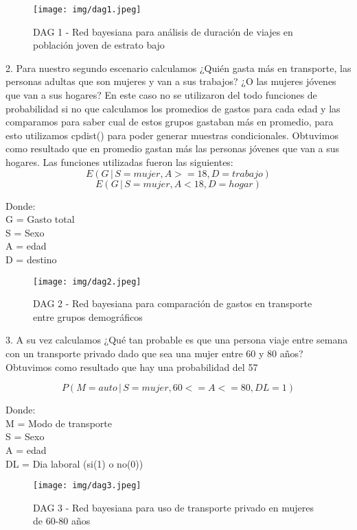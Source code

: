 \documentclass{ajceam-class}   %
\begin{document}
\begin{figure}[h]
\centering
\texttt{[image: img/dag1.jpeg]}
\caption{DAG 1 - Red bayesiana para análisis de duración de viajes en población joven de estrato bajo}
\label{fig:dag1}
\end{figure}

2.	Para nuestro segundo escenario calculamos ¿Quién gasta más en transporte, las personas adultas que son mujeres y van a sus trabajos? ¿O las mujeres jóvenes que van a sus hogares? En este caso no se utilizaron del todo funciones de probabilidad si no que calculamos los promedios de gastos para cada edad y las comparamos para saber cual de estos grupos gastaban más en promedio, para esto utilizamos cpdist() para poder generar muestras condicionales. Obtuvimos como resultado que en promedio gastan más las personas jóvenes que van a sus hogares. Las funciones utilizadas fueron las siguientes:
$$E(G \,|\, S = mujer, A >= 18, D = trabajo)$$
$$E(G \,|\, S = mujer, A < 18, D = hogar)$$

Donde:\\
G = Gasto total\\
S = Sexo\\
A = edad\\
D = destino\\

\begin{figure}[h]
\centering
\texttt{[image: img/dag2.jpeg]}
\caption{DAG 2 - Red bayesiana para comparación de gastos en transporte entre grupos demográficos}
\label{fig:dag2}
\end{figure}

3.	A su vez calculamos ¿Qué tan probable es que una persona viaje entre semana con un transporte privado dado que sea una mujer entre 60 y 80 años? Obtuvimos como resultado que hay una probabilidad del 57%

$$P(M = auto\, |\,S = mujer, 60<= A <= 80, DL = 1)$$

Donde:\\
M = Modo de transporte\\
S = Sexo\\
A = edad\\
DL = Dia laboral (si(1) o no(0))\\

\begin{figure}[h]
\centering
\texttt{[image: img/dag3.jpeg]}
\caption{DAG 3 - Red bayesiana para uso de transporte privado en mujeres de 60-80 años}
\label{fig:dag3}
\end{figure}
\end{document}
